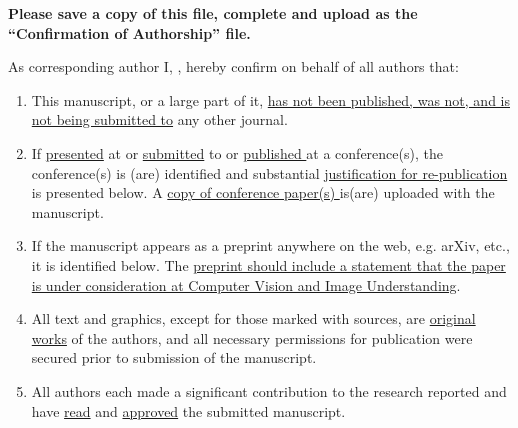 \documentclass[times,sort&compress]{elsarticle}
\begin{document}
\thispagestyle{empty}
                                                             
\begin{table}[!th]

\begin{minipage}{.9\textwidth}
\baselineskip12pt
\ifpreprint
  \vspace*{1pc}
\else
  \vspace*{-6pc}
\fi

\vskip6pt


\vskip1pc


{\bf Please save a copy of this file, complete and upload as the ``Confirmation of
Authorship'' file.}

\vskip1pc

As corresponding author I, \underline{\hphantom{\hspace*{7cm}}}, hereby confirm on
behalf of all authors that:

\vskip1pc

\begin{enumerate}
\itemsep=3pt
\item This manuscript, or a large part of it, \underline {has not been published,  was
not, and is not being submitted to} any other journal. 

\item If \underline {presented} at or \underline {submitted} to or \underline
{published }at a conference(s), the conference(s) is (are) identified and  substantial
\underline {justification for re-publication} is presented  below. A \underline {copy of
conference paper(s) }is(are) uploaded with the  manuscript.

\item If the manuscript appears as a preprint anywhere on the web, e.g. arXiv,  etc., it
is identified below. The \underline {preprint should include a  statement that the paper
is under consideration at Computer Vision and Image Understanding}.

\item All text and graphics, except for those marked with sources, are \underline
{original works} of the authors, and all necessary permissions for  publication were
secured prior to submission of the manuscript.

\item All authors each made a significant contribution to the research reported  and
have \underline {read} and \underline {approved} the submitted  manuscript. 
\end{enumerate}


\end{minipage}
\end{table}
\end{document}
